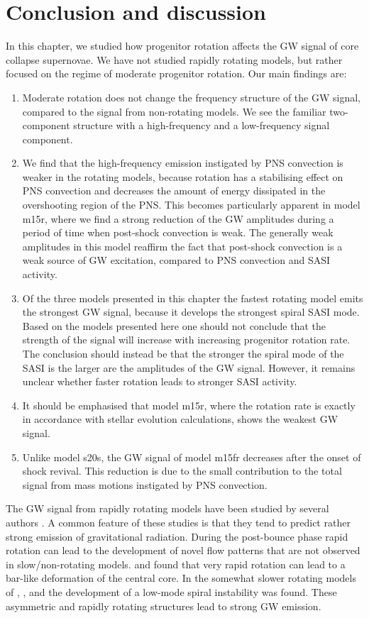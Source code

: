 \section{Conclusion and discussion}
In this chapter, we studied how progenitor rotation affects the GW signal of core collapse supernovae.
We have not studied rapidly rotating models, but rather focused on the regime of moderate progenitor rotation.
Our main findings are:
\begin{enumerate}
\item Moderate rotation does not change the frequency structure of the GW signal, compared to the signal from non-rotating models.
We see the familiar two-component structure with a high-frequency and a low-frequency signal component.
\item We find that the high-frequency emission instigated by PNS convection is weaker in the rotating models, because rotation has a 
stabilising effect on PNS convection and decreases the amount of energy dissipated in the overshooting region of the PNS.
This becomes particularly apparent in model m15r, where we find a strong reduction of the GW amplitudes during a 
period of time when post-shock convection is weak. The generally weak amplitudes in this model reaffirm the fact that post-shock convection is a weak source of GW excitation, compared to PNS convection and SASI activity.
\item Of the three models presented in this chapter the fastest rotating model emits the strongest GW signal,
because it develops the strongest spiral SASI mode. Based on the models presented here one should not conclude
that the strength of the signal will increase with increasing progenitor rotation rate. The conclusion should instead be
that the stronger the spiral mode of the SASI is the larger are the amplitudes of the GW signal. However, it remains unclear
whether faster rotation leads to stronger SASI activity.
\item It should be emphasised that model m15r, where the rotation rate is exactly in accordance with stellar evolution
calculations, shows the weakest GW signal.  
\item Unlike model s20s, the GW signal of model m15fr decreases after the onset of shock revival. This reduction is due to
the small contribution to the total signal from mass motions instigated by PNS convection.
\end{enumerate}

The GW signal from rapidly rotating models have been studied 
by several authors \citep{mueller_82,rampp_98,shibata_05,ott_05,scheidegger_10,kuroda_14,takiwaki_16}. 
A common feature of these studies is that they tend to predict rather strong emission of gravitational radiation. During the post-bounce phase rapid rotation can lead to the
development of novel flow patterns that are not observed in slow/non-rotating models.
\cite{rampp_98} and \cite{shibata_05} found that very rapid rotation can
lead to a bar-like deformation of the central core. In the somewhat slower 
rotating models of \cite{ott_05}, \cite{kuroda_14}, and \cite{takiwaki_16} the development of
a low-mode spiral instability was found. These asymmetric and rapidly rotating structures
lead to strong GW emission. 

